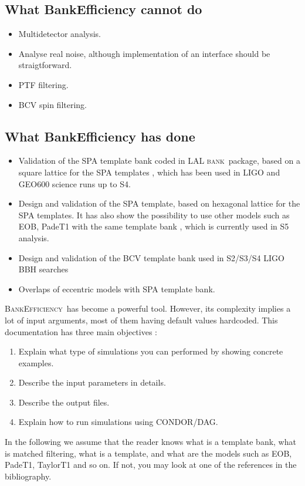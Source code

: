 \documentclass[a4paper,10pt]{article}
\newcommand{\bank}{\textsc{bank}~}
\newcommand{\be}{\textsc{BankEfficiency}~}
\begin{document}
\subsection*{What BankEfficiency cannot do }
\begin{itemize}
 \item Multidetector analysis.
 \item Analyse real noise, although implementation of an interface should be straigtforward.
 \item PTF filtering.
 \item BCV spin filtering.
\end{itemize}

\subsection*{What BankEfficiency has done}
\begin{itemize}
 \item Validation of the SPA template bank coded in LAL \bank package, based on a square lattice for the SPA templates \cite{squarebank}, which has been used in LIGO and GEO600 science runs up to S4.
 \item Design and validation of the SPA template, based on hexagonal lattice for the SPA templates. It has also show the possibility to use other models such as EOB, PadeT1 with the same template bank \cite{hexabank}, which is currently used in S5 analysis.
\item Design and validation of the BCV template bank used in S2/S3/S4 LIGO BBH searches \cite{bcvbank}
\item Overlaps of eccentric models with SPA template bank.
\end{itemize}


\be has become a powerful tool. However, its complexity implies a lot of input arguments, most of them having default values hardcoded. This documentation has three main objectives :
\begin{enumerate}
 \item Explain what type of simulations you can performed by showing concrete examples.
 \item Describe the input parameters in details.
 \item Describe the output files.
 \item Explain how to run simulations using CONDOR/DAG.
\end{enumerate}

In the following we assume that the reader knows what is a template bank, what is matched filtering, what is a template, and what are the models such as EOB, PadeT1, TaylorT1 and so on. If not, you may look at one of the references in the bibliography.
\end{document}
